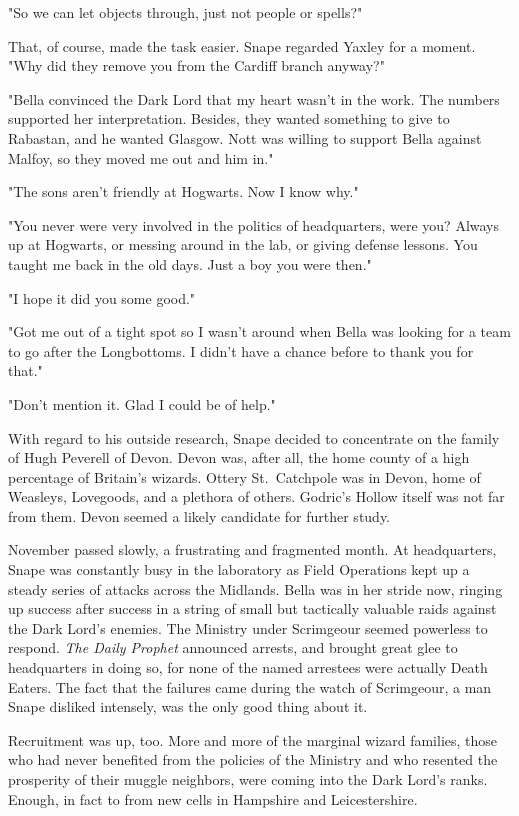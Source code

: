 "So we can let objects through, just not people or spells?"

That, of course, made the task easier. Snape regarded Yaxley for a moment. "Why did they remove you from the Cardiff branch anyway?"

"Bella convinced the Dark Lord that my heart wasn't in the work. The numbers supported her interpretation. Besides, they wanted something to give to Rabastan, and he wanted Glasgow. Nott was willing to support Bella against Malfoy, so they moved me out and him in."

"The sons aren't friendly at Hogwarts. Now I know why."

"You never were very involved in the politics of headquarters, were you? Always up at Hogwarts, or messing around in the lab, or giving defense lessons. You taught me back in the old days. Just a boy you were then."

"I hope it did you some good."

"Got me out of a tight spot so I wasn't around when Bella was looking for a team to go after the Longbottoms. I didn't have a chance before to thank you for that."

"Don't mention it. Glad I could be of help."

With regard to his outside research, Snape decided to concentrate on the family of Hugh Peverell of Devon. Devon was, after all, the home county of a high percentage of Britain's wizards. Ottery St.~Catchpole was in Devon, home of Weasleys, Lovegoods, and a plethora of others. Godric's Hollow itself was not far from them. Devon seemed a likely candidate for further study.

November passed slowly, a frustrating and fragmented month. At headquarters, Snape was constantly busy in the laboratory as Field Operations kept up a steady series of attacks across the Midlands. Bella was in her stride now, ringing up success after success in a string of small but tactically valuable raids against the Dark Lord's enemies. The Ministry under Scrimgeour seemed powerless to respond. \emph{The Daily Prophet} announced arrests, and brought great glee to headquarters in doing so, for none of the named arrestees were actually Death Eaters. The fact that the failures came during the watch of Scrimgeour, a man Snape disliked intensely, was the only good thing about it.

Recruitment was up, too. More and more of the marginal wizard families, those who had never benefited from the policies of the Ministry and who resented the prosperity of their muggle neighbors, were coming into the Dark Lord's ranks. Enough, in fact to from new cells in Hampshire and Leicestershire.

